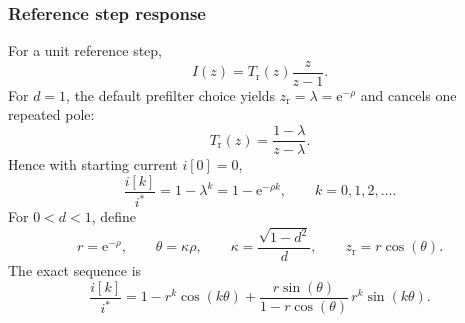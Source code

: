 \begin{frame}
    \frametitle{Reference step response}
    For a unit reference step,
    \begin{equation}
        I(z)=T_\mathrm{r}(z)\frac{z}{z-1}.
        \label{eq:reference_step_z}
    \end{equation}\pause%
    For $d=1$, the default prefilter choice yields $z_\mathrm{r}=\lambda=\mathrm{e}^{-\rho}$ and cancels one repeated pole:
    \begin{equation}
        T_\mathrm{r}(z)=\frac{1-\lambda}{z-\lambda}.
        \label{eq:reference_tf_d1}
    \end{equation}\pause%
    Hence with starting current $i[0]=0$,
    \begin{equation}
        \frac{i[k]}{i^{*}}
        =1-\lambda^k
        =1-\mathrm{e}^{-\rho k},
        \qquad k=0,1,2,\ldots .
        \label{eq:reference_sequence_d1}
    \end{equation}\pause%
    For $0<d<1$, define
    \begin{equation}
        r=\mathrm{e}^{-\rho},\qquad
        \theta=\kappa\rho,\qquad
        \kappa=\frac{\sqrt{1-d^2}}{d},\qquad
        z_\mathrm{r}=r\cos(\theta).
        \label{eq:pole_params_complex}
    \end{equation}\pause%
    The exact sequence is
    \begin{equation}
        \frac{i[k]}{i^{*}}
        =1-r^k\cos(k\theta)
        +\frac{r\sin(\theta)}{1-r\cos(\theta)}\,r^k\sin(k\theta).
        \label{eq:reference_sequence_complex}
    \end{equation}
\end{frame}

